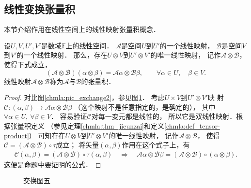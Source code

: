 \subsection{线性变换张量积}
本节介绍作用在线性空间上的线性映射张量积概念．
\begin{proposition}\label{chmla:thm_tp-limap}
    设$U,V,U',V'$是数域$\mathbb{F}$上的线性空间．
    $\mathcal{A}$是空间$U$到$U'$的一个线性映射，
    $\mathcal{B}$是空间$V$到$V'$的一个线性映射．
    那么，存在$U\otimes V$到$U'\otimes V'$的唯一线性映射，
    记作$\mathcal{A}\otimes \mathcal{B}$，使得下式成立，
    \begin{equation}
        (\mathcal{A}\otimes \mathcal{B}) (\alpha \otimes \beta )
        =\mathcal{A}\alpha \otimes \mathcal{B}\beta ,
        \qquad \forall \alpha \in U, \quad \beta\in V.
    \end{equation}
    线性映射$\mathcal{A}\otimes \mathcal{B}$称为$\mathcal{A}$与$\mathcal{B}$的{\heiti 张量积}．
\end{proposition}
\begin{proof}
    对比图\ref{chmla:pic_exchange2}，参见图\ref{chmla:pic_exchange5}．
    考虑$U\times V$到$U'\otimes V'$映
    射$\mathcal{C}:(\alpha,\beta)\to \mathcal{A}\alpha \otimes \mathcal{B}\beta$
    （这个映射不是任意指定的，是确定的），
    其中$\forall \alpha \in U, \ \forall \beta\in V$．
    容易验证$\mathcal{C}$对每一变元都是线性的，
    所以它是双线性映射．根据张量积定义
    （参见定理\ref{chmla:thm_jicunzai}和定义\ref{chmla:def_tensor-product}）
    可知存在$U\otimes V$到$U'\otimes V'$的唯一线性映射，
    记作$\mathcal{A}\otimes \mathcal{B}$，
    使得$\mathcal{C}=(\mathcal{A}\otimes \mathcal{B})\circ \tau$成立；
    将矢量$(\alpha,\beta)$作用在这个式子上，有
    \begin{align*}
        \mathcal{C}(\alpha,\beta)=(\mathcal{A}\otimes \mathcal{B})\circ \tau(\alpha,\beta)
        \quad {\Rightarrow} \quad
        \mathcal{A}\alpha \otimes \mathcal{B}\beta
        =(\mathcal{A}\otimes \mathcal{B})\circ (\alpha\otimes\beta) .
    \end{align*}
    这便是命题中要证明的公式．
\end{proof}

\begin{figure}[htb]
    \centering
    \caption{交换图五}\label{chmla:pic_exchange5}
\end{figure}

